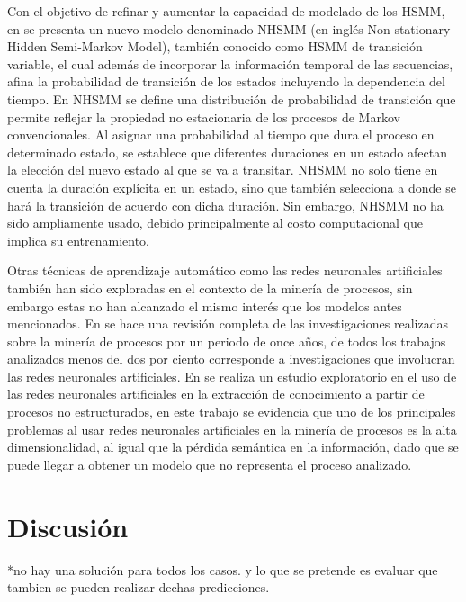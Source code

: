 Con el objetivo de refinar y aumentar la capacidad de modelado de los HSMM, en \cite{Marhasev2006} se presenta un nuevo modelo denominado NHSMM (en inglés Non-stationary Hidden Semi-Markov Model), también conocido como HSMM de transición variable, el cual además de incorporar la información temporal de las secuencias, afina la probabilidad de transición de los estados incluyendo la dependencia del tiempo. En NHSMM se define una distribución de probabilidad de transición que permite reflejar la propiedad no estacionaria de los procesos de Markov convencionales. Al asignar una probabilidad al tiempo que dura el proceso en determinado estado, se establece que diferentes duraciones en un estado afectan la elección del nuevo estado al que se va a transitar. NHSMM no solo tiene en cuenta la duración explícita en un estado, sino que también selecciona a donde se hará la transición de acuerdo con dicha duración. Sin embargo, NHSMM no ha sido ampliamente usado, debido principalmente al costo computacional que implica su entrenamiento.

Otras técnicas de aprendizaje automático como las redes neuronales artificiales también han sido exploradas en el contexto de la minería de procesos, sin embargo estas no han alcanzado el mismo interés que los modelos antes mencionados. En \cite{Maita2015} se hace una revisión completa de las investigaciones realizadas sobre la minería de procesos por un periodo de once años, de todos los trabajos analizados menos del dos por ciento corresponde a investigaciones que involucran las redes neuronales artificiales. En \cite{Maita2017} se realiza un estudio exploratorio en el uso de las redes neuronales artificiales en la extracción de conocimiento a partir de procesos no estructurados, en este trabajo se evidencia que uno de los principales problemas al usar redes neuronales artificiales en la minería de procesos es la alta dimensionalidad, al igual que la pérdida semántica en la información, dado que se puede llegar a obtener un modelo que no representa el proceso analizado.

\section{Discusión} %
\label{section1.4}

*no hay una solución para todos los casos. y lo que se pretende es evaluar que tambien se pueden realizar dechas predicciones.

